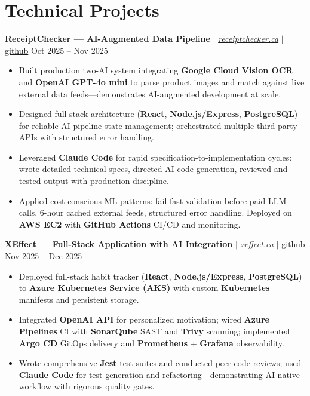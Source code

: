 \documentclass[11pt,a4paper]{article}
\begin{document}
\section{Technical Projects}

\textbf{ReceiptChecker — AI-Augmented Data Pipeline} $|$ \href{https://receiptchecker.ca/}{\emph{receiptchecker.ca}} $|$ \href{https://github.com/bhat0155/receipt-check}{\small github} \hfill Oct 2025 -- Nov 2025
\begin{itemize}
    \item Built production two-AI system integrating \textbf{Google Cloud Vision OCR} and \textbf{OpenAI GPT-4o mini} to parse product images and match against live external data feeds—demonstrates AI-augmented development at scale.
    \item Designed full-stack architecture (\textbf{React}, \textbf{Node.js/Express}, \textbf{PostgreSQL}) for reliable AI pipeline state management; orchestrated multiple third-party APIs with structured error handling.
    \item Leveraged \textbf{Claude Code} for rapid specification-to-implementation cycles: wrote detailed technical specs, directed AI code generation, reviewed and tested output with production discipline.
    \item Applied cost-conscious ML patterns: fail-fast validation before paid LLM calls, 6-hour cached external feeds, structured error handling. Deployed on \textbf{AWS EC2} with \textbf{GitHub Actions} CI/CD and monitoring.
\end{itemize}

\vspace{4pt}

\textbf{XEffect — Full-Stack Application with AI Integration} $|$ \href{https://www.xeffect.ca/app}{\emph{xeffect.ca}} $|$ \href{https://github.com/bhat0155/xeffect}{\small github} \hfill Nov 2025 -- Dec 2025
\begin{itemize}
    \item Deployed full-stack habit tracker (\textbf{React}, \textbf{Node.js/Express}, \textbf{PostgreSQL}) to \textbf{Azure Kubernetes Service (AKS)} with custom \textbf{Kubernetes} manifests and persistent storage.
    \item Integrated \textbf{OpenAI API} for personalized motivation; wired \textbf{Azure Pipelines} CI with \textbf{SonarQube} SAST and \textbf{Trivy} scanning; implemented \textbf{Argo CD} GitOps delivery and \textbf{Prometheus} + \textbf{Grafana} observability.
    \item Wrote comprehensive \textbf{Jest} test suites and conducted peer code reviews; used \textbf{Claude Code} for test generation and refactoring—demonstrating AI-native workflow with rigorous quality gates.
\end{itemize}
\end{document}
